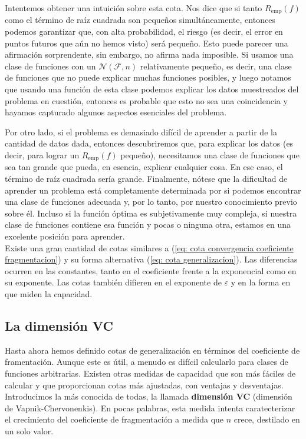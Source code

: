 \documentclass{report}
\begin{document}
Intentemos obtener una intuición sobre esta cota. Nos dice que si tanto \(R_{\text{emp}}(f)\) como el término
de raíz cuadrada son pequeños simultáneamente, entonces podemos garantizar que, con alta probabilidad, el
riesgo (es decir, el error en puntos futuros que aún no hemos visto) será pequeño. Esto puede parecer una
afirmación sorprendente, sin embargo, no afirma nada imposible. Si usamos una clase de funciones con un
\(\mathcal{N}(\mathcal{F}, n)\) relativamente pequeño, es decir, una clase de funciones que no puede explicar
muchas funciones posibles, y luego notamos que usando una función de esta clase podemos explicar los datos muestreados
del problema en cuestión, entonces es probable que esto no sea una coincidencia y hayamos capturado algunos aspectos
esenciales del problema.

Por otro lado, si el problema es demasiado difícil de aprender a partir de la cantidad de datos dada, entonces
descubriremos que, para explicar los datos (es decir, para lograr un \(R_{\text{emp}}(f)\) pequeño), necesitamos
una clase de funciones que sea tan grande que pueda, en esencia, explicar cualquier cosa. En ese caso, el término
de raíz cuadrada sería grande. Finalmente, nótese que la dificultad de aprender un problema está completamente
determinada por si podemos encontrar una clase de funciones adecuada y, por lo tanto, por nuestro conocimiento
previo sobre él. Incluso si la función óptima es subjetivamente muy compleja, si nuestra clase de funciones
contiene esa función y pocas o ninguna otra, estamos en una excelente posición para aprender.\\

Existe una gran cantidad de cotas similares a (\ref{eq: cota convergencia coeficiente fragmentacion})
y su forma alternativa (\ref{eq: cota generalizacion}). Las diferencias ocurren en
las constantes, tanto en el coeficiente frente a la exponencial como en su exponente. Las cotas también
difieren en el exponente de \(\varepsilon\) y en la forma en que miden la capacidad.

\subsection{La dimensión VC}

Hasta ahora hemos definido cotas de generalización en términos del coeficiente de framentación.
Aunque este es útil, a menudo es difícil calcularlo para clases de funciones arbitrarias. Existen otras medidas de capacidad
que son más fáciles de calcular y que proporcionan cotas más ajustadas, con ventajas y desventajas.
Introducimos la más conocida de todas, la llamada \textbf{dimensión VC} (dimensión de Vapnik-Chervonenkis). En pocas palabras,
esta medida intenta caratecterizar el crecimiento del coeficiente de fragmentación a medida que $n$ crece, destilado en un
solo valor.
\end{document}
